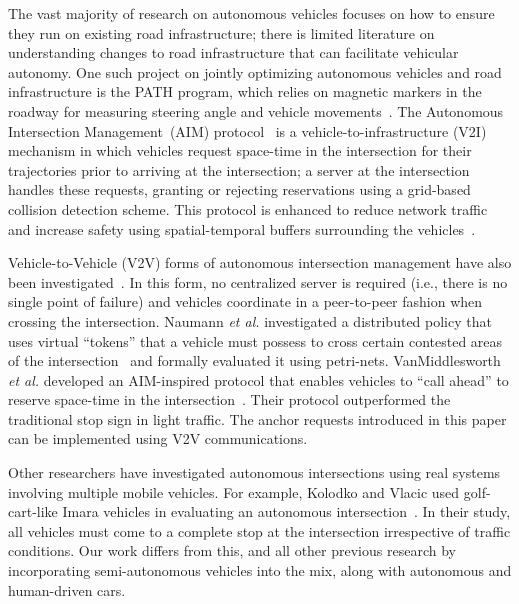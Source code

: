 The vast majority of research on autonomous vehicles focuses on how to
ensure they run on existing road infrastructure; there is limited
literature on understanding changes to road infrastructure that can
facilitate vehicular autonomy.  One such project on jointly optimizing
autonomous vehicles and road infrastructure is the PATH program, which
relies on magnetic markers in the roadway for measuring steering angle
and vehicle movements~\cite{bib:Shladover91Automated}.  The Autonomous
Intersection Management~(AIM) protocol~\cite{bib:Dresner08Multiagent, trr11,
bib:Quinlan10Bringing} is a vehicle-to-infrastructure (V2I) mechanism in
which vehicles request space-time in the intersection for their
trajectories prior to arriving at the intersection; a server at the
intersection handles these requests, granting or rejecting
reservations using a grid-based collision detection scheme. This
protocol is enhanced to reduce network traffic and increase safety
using spatial-temporal buffers surrounding the vehicles~\cite{trr11}.

Vehicle-to-Vehicle (V2V) forms of autonomous intersection management
have also been investigated~\cite{naumann97:intersection,
ATT08-vanmiddlesworth}.  In this form, no centralized server is
required (i.e., there is no single point of failure) and vehicles
coordinate in a peer-to-peer fashion when crossing the
intersection. Naumann {\em et al.} investigated a distributed policy
that uses virtual ``tokens'' that a vehicle must possess to cross
certain contested areas of the
intersection~\cite{naumann97:intersection} and formally evaluated it
using petri-nets.  VanMiddlesworth {\em et al.} developed an
AIM-inspired protocol that enables vehicles to ``call ahead'' to
reserve space-time in the
intersection~\cite{ATT08-vanmiddlesworth}. Their protocol outperformed
the traditional stop sign in light traffic. The anchor requests 
introduced in this paper can be implemented using V2V communications.


Other researchers have investigated autonomous intersections using
real systems involving multiple mobile vehicles.  For example, Kolodko
and Vlacic used golf-cart-like Imara vehicles in evaluating an
autonomous intersection~\cite{Kolodko03:INRIA}.  In their study, all
vehicles must come to a complete stop at the intersection irrespective
of traffic conditions.  Our work differs from this, and all other
previous research by incorporating semi-autonomous vehicles into the
mix, along with autonomous and human-driven cars.



